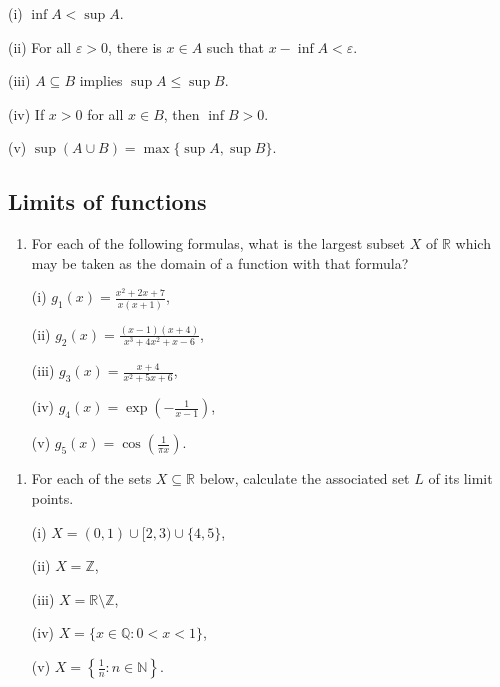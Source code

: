 \documentclass[letterpaper,10pt,english]{jupyterBook}
\begin{document}
\sphinxAtStartPar
(i) \(\inf A < \sup A\).

\sphinxAtStartPar
(ii) For all \(\varepsilon>0\), there is \(x\in A\) such that \(x-\inf A < \varepsilon\).

\sphinxAtStartPar
(iii) \(A\subseteq B\) implies \(\sup A \leq \sup B\).

\sphinxAtStartPar
(iv) If \(x>0\) for all \(x\in B\), then \(\inf B >0\).

\sphinxAtStartPar
(v) \(\sup(A\cup B) = \max\{\sup A,\sup B\}\).




\subsection{Limits of functions}
\label{\detokenize{Problems:limits-of-functions}}\label{\detokenize{Problems:ch2prob}}\label{\detokenize{Problems:id1}}\begin{enumerate}
%
\item {} 
\sphinxAtStartPar
For each of the following formulas, what is the largest subset \(X\) of \(\mathbb{R}\)  which may be taken as the domain of a function with that formula?

\sphinxAtStartPar
(i) \(g_{1}(x) = \displaystyle\frac{x^{2} + 2x + 7}{x(x+1)}\),

\sphinxAtStartPar
(ii) \(g_{2}(x) = \displaystyle\frac{(x-1)(x+4)}{x^{3} + 4x^{2} + x - 6}\),

\sphinxAtStartPar
(iii) \(g_{3}(x) = \displaystyle\frac{x+4}{x^{2}+5x + 6}\),

\sphinxAtStartPar
(iv) \(g_{4}(x) = \exp{\left(-\displaystyle\frac{1}{x-1}\right)}\),

\sphinxAtStartPar
(v) \(g_{5}(x) = \cos\left(\displaystyle\frac{1}{\pi x}\right)\).

\end{enumerate}
\label{\detokenize{Problems:id2}}\begin{enumerate}
%
\setcounter{enumi}{1}
\item {} 
\sphinxAtStartPar
{} For each of the sets \(X\subseteq\mathbb{R}\) below, calculate the associated set \(L\) of its limit points.

\sphinxAtStartPar
(i) \(X=(0,1)\cup[2,3)\cup\{4,5\}\),

\sphinxAtStartPar
(ii) \(X=\mathbb{Z}\),

\sphinxAtStartPar
(iii) \(X=\mathbb{R}\setminus\mathbb{Z}\),

\sphinxAtStartPar
(iv) \(X=\{x\in\mathbb{Q}:0<x<1\}\),

\sphinxAtStartPar
(v) \(X=\displaystyle\left\{\frac{1}{n}:n\in\mathbb{N}\right\}\).

\end{enumerate}
\end{document}
